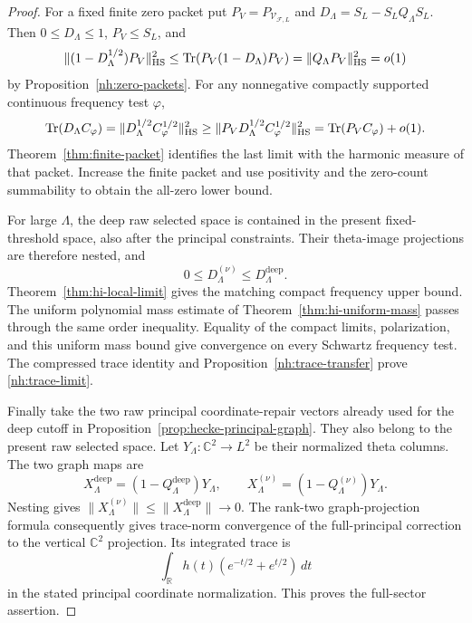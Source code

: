 \begin{proof}
For a fixed finite zero packet put
$P_V=P_{\mathcal V_{\mathcal F,L}}$ and
$D_\Lambda=S_L-S_LQ_\Lambda S_L$.
Then $0\leq D_\Lambda\leq1$, $P_V\leq S_L$, and
\[
 \|(1-D_\Lambda^{1/2})P_V\|_{\mathrm{HS}}^2
 \leq\operatorname{Tr}(P_V(1-D_\Lambda)P_V)
                    =\|Q_\Lambda P_V\|_{\mathrm{HS}}^2=o(1)
\]
by Proposition~\ref{nh:zero-packets}.
For any nonnegative compactly supported continuous frequency test $\varphi$,
\[
 \operatorname{Tr}(D_\Lambda C_\varphi)
 =\|D_\Lambda^{1/2}C_\varphi^{1/2}\|_{\mathrm{HS}}^2
 \geq\|P_VD_\Lambda^{1/2}C_\varphi^{1/2}\|_{\mathrm{HS}}^2
 =\operatorname{Tr}(P_VC_\varphi)+o(1).
\]
Theorem~\ref{thm:finite-packet} identifies the last limit
with the harmonic measure of that packet. Increase the finite
packet and use positivity and the zero-count summability to
obtain the all-zero lower bound.

For large $\Lambda$, the deep raw selected space is contained
in the present fixed-threshold space, also after the principal
constraints. Their theta-image projections are therefore
nested, and
\[
 0\leq D_\Lambda^{(\nu)}\leq D_\Lambda^{\mathrm{deep}}.
\]
Theorem~\ref{thm:hi-local-limit} gives the matching compact
frequency upper bound. The uniform polynomial mass estimate
of Theorem~\ref{thm:hi-uniform-mass} passes through the same
order inequality. Equality of the compact limits, polarization,
and this uniform mass bound give convergence on every Schwartz
frequency test.
The compressed trace identity and
Proposition~\ref{nh:trace-transfer} prove
\eqref{nh:trace-limit}.

Finally take the two raw principal coordinate-repair vectors
already used for the deep cutoff in
Proposition~\ref{prop:hecke-principal-graph}.
They also belong to the present raw selected space. Let
$Y_\Lambda:\mathbb C^2\to L^2$ be their normalized theta
columns. The two graph maps are
\[
 X_\Lambda^{\mathrm{deep}}
       =(1-Q_\Lambda^{\mathrm{deep}})Y_\Lambda,\qquad
 X_\Lambda^{(\nu)}=(1-Q_\Lambda^{(\nu)})Y_\Lambda.
\]
Nesting gives
$\|X_\Lambda^{(\nu)}\|\leq
\|X_\Lambda^{\mathrm{deep}}\|\to0$.
The rank-two graph-projection formula consequently gives
trace-norm convergence of the full-principal correction to
the vertical $\mathbb C^2$ projection. Its integrated trace is
\[
 \int_{\mathbb R}h(t)(e^{-t/2}+e^{t/2})\,dt
\]
in the stated principal coordinate normalization. This proves
the full-sector assertion.
\end{proof}
